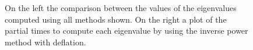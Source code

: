 \begin{figure}[H]
    \centering
    \caption{On the left the comparison between the values of the eigenvalues computed using all methods shown. On the right a plot of the partial times to compute each eigenvalue by using the inverse power method with deflation.}
    \label{Eigenvalues_comp_norm}
\end{figure}

